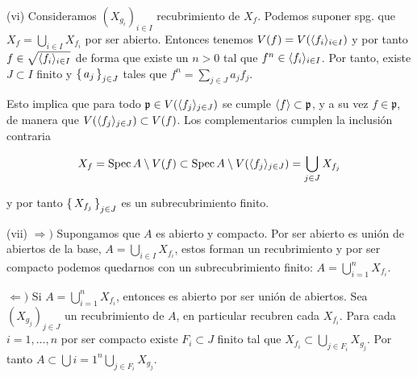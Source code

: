 \documentclass[../main.tex]{subfiles}
\begin{document}
(vi) Consideramos $(X_{g_i})_{i\in I}$ recubrimiento de $X_f$. Podemos suponer spg. que $X_f = \bigcup_{i\in I} X_{f_i}$ por ser abierto. Entonces tenemos $V(f) = V(\langle f_i \rangle_{i\in I})$ y por tanto $f\in \sqrt{\langle f_i \rangle_{i\in I}}$ de forma que existe un $n>0$ tal que $f^n \in \langle f_i \rangle_{i\in I}$.
Por tanto, existe $J\subset I$ finito y $\set{a_j}_{j\in J}$ tales que $f^n = \sum_{j\in J}a_j f_j$.

Esto implica que para todo $\mathfrak p \in  V(\langle f_j \rangle_{j\in J})$ se cumple $\langle f \rangle \subset \mathfrak p$, y a su vez $f \in \mathfrak p$, de manera que $ V(\langle f_j \rangle_{j\in J}) \subset V(f)$. Los complementarios cumplen la inclusión contraria

\[ X_f = \operatorname{Spec} A \setminus V(f) \subset \operatorname{Spec} A \setminus V(\langle f_j \rangle_{j\in J}) = \bigcup_{j\in J} X_{f_j} \]

y por tanto $\set{X_{f_j}}_{j\in J}$ es un subrecubrimiento finito.

(vii) $\Rightarrow)$ Supongamos que $A$ es abierto y compacto. Por ser abierto es unión de abiertos de la base, $A=\bigcup_{i\in I}X_{f_i}$, estos forman un recubrimiento y por ser compacto podemos quedarnos con un subrecubrimiento finito: $A=\bigcup_{i=1}^n X_{f_i}$.

$\Leftarrow)$ Si $A=\bigcup_{i=1}^n X_{f_i}$, entonces es abierto por ser unión de abiertos. Sea $(X_{g_j})_{j\in J}$ un recubrimiento de $A$, en particular recubren cada $X_{f_i}$. Para cada $i=1,\dots, n$ por ser compacto existe $F_i \subset J$ finito tal que $X_{f_i}\subset \bigcup_{j \in F_i} X_{g_j}$. Por tanto $A \subset \bigcup{i=1}^n \bigcup_{j \in F_i} X_{g_j}$.
\end{document}
